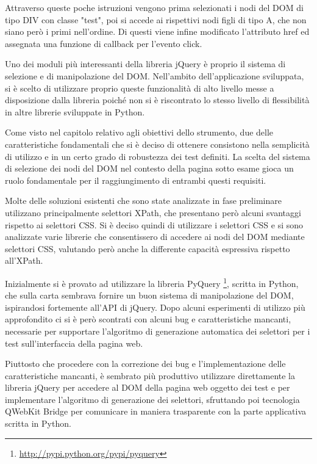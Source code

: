 

Attraverso queste poche istruzioni vengono prima selezionati i nodi del DOM di tipo DIV con classe "test", poi si accede ai rispettivi nodi figli di tipo A, che non siano però i primi nell'ordine. Di questi viene infine modificato l'attributo href ed assegnata una funzione di callback per l'evento click. 

Uno dei moduli più interessanti della libreria jQuery è proprio il sistema di selezione e di manipolazione del DOM. Nell'ambito dell'applicazione sviluppata, si è scelto di utilizzare proprio queste funzionalità di alto livello messe a disposizione dalla libreria poiché non si è riscontrato lo stesso livello di flessibilità in altre librerie sviluppate in Python.

Come visto nel capitolo relativo agli obiettivi dello strumento, due delle caratteristiche fondamentali che si è deciso di ottenere consistono nella semplicità di utilizzo e in un certo grado di robustezza dei test definiti. La scelta del sistema di selezione dei nodi del DOM nel contesto della pagina sotto esame gioca un ruolo fondamentale per il raggiungimento di entrambi questi requisiti. 

Molte delle soluzioni esistenti che sono state analizzate in fase preliminare utilizzano principalmente selettori XPath, che presentano però alcuni svantaggi rispetto ai selettori CSS. Si è deciso quindi di utilizzare i selettori CSS e si sono analizzate varie librerie che consentissero di accedere ai nodi del DOM mediante selettori CSS, valutando però anche la differente capacità espressiva rispetto all'XPath.

Inizialmente si è provato ad utilizzare la libreria PyQuery \footnote{\url{http://pypi.python.org/pypi/pyquery}}, scritta in Python, che sulla carta sembrava fornire un buon sistema di manipolazione del DOM, ispirandosi fortemente all'API di jQuery. Dopo alcuni esperimenti di utilizzo più approfondito ci si è però scontrati con alcuni bug e caratteristiche mancanti, necessarie per supportare l'algoritmo di generazione automatica dei selettori per i test sull'interfaccia della pagina web. 

Piuttosto che procedere con la correzione dei bug e l'implementazione delle caratteristiche mancanti, è sembrato più produttivo utilizzare direttamente la libreria jQuery per accedere al DOM della pagina web oggetto dei test e per implementare l'algoritmo di generazione dei selettori, sfruttando poi tecnologia QWebKit Bridge per comunicare in maniera trasparente con la parte applicativa scritta in Python.

